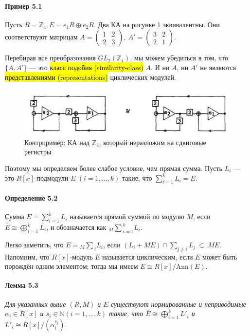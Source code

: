 \documentclass[a4paper,12pt]{article}
\newcommand{\dirsummod}[1]{{_{{#1}}\!\!\sum}}
\newcommand{\Ann}{\text{Ann}}
\begin{document}
\paragraph{Пример 5.1}
Пусть $R = \mathbb{Z}_4, E = e_1 R \oplus e_2 R$. Два КА на рисунке \ref{fig4} эквивалентны. Они соответствуют матрицам ${ A =
	\begin{pmatrix}
		1 & 2\\
		2 & 3
\end{pmatrix}}, ~
{ A' =
	\begin{pmatrix}
		3 & 2\\
		2 & 1
\end{pmatrix}}
$.

Перебирая все преобразования $GL_2(\mathbb{Z}_4)$, мы можем убедиться в том, что $\{A, A'\}$ --- это \hl{класс подобия (similarity-class)} $A$. И ни $A$, ни $A'$ не являются \hl{представлениями (representations)} циклических модулей. \\

\begin{figure}[h]
	\centering
	\includegraphics[width=0.7\linewidth]{pictures/fig4.png}
	\caption{Контрпример: КА над $\mathbb{Z}_4$, который неразложим на сдвиговые регистры}
	\label{fig4}
\end{figure}

Поэтому мы определяем более слабое условие, чем прямая сумма. Пусть $L_i$ --- это $R[x]$-подмодули $E$ $(i = 1,...,k)$ такие, что $\sum_{i=1}^{k} L_i = E$.

\paragraph{Определение 5.2}
Сумма $E = \sum_{i=1}^{k} L_i$ называется прямой суммой по модулю $M$, если $\overline{E} \cong \bigoplus_{i=1}^{k} \overline{L_i}$, и обозначается как $\dirsummod{M}_{i=1}^{k} L_i$.

Легко заметить, что $E = \dirsummod{M}_i L_i$, если $(L_i + M E) \cap \sum_{j \ne i} L_j ~ \subset ~ M E$. Напомним, что $R[x]$-модуль $E$ называется циклическим, если $E$ может быть порождён одним элементом; тогда мы имеем $E \cong R[x]/\Ann(E)$.

\paragraph{Лемма 5.3}
{\itshape
Для указанных выше $(R, M)$ и $E$ существуют нормированные и неприводимые $\alpha_i \in \overline{R}[x]$ и $s_i \in \mathbb{N} (i = 1,...,k)$ такие, что $\overline{E} \cong \bigoplus_{i=1}^{k} L'_i$ и $L'_i \cong \overline{R}[x]/(\alpha_i^{s_j})$.
}
\end{document}
